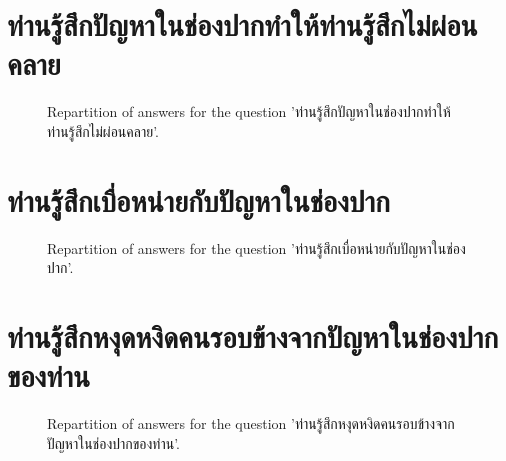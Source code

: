 \documentclass[12pt]{article}
\begin{document}
\clearpage{}
\section{ท่านรู้สึกปัญหาในช่องปากทำให้ท่านรู้สึกไม่ผ่อนคลาย}

\label{sec:138}


\begin{figure}[h!]
    \caption{\label{figure:q138-1}Repartition of answers for the question 'ท่านรู้สึกปัญหาในช่องปากทำให้ท่านรู้สึกไม่ผ่อนคลาย'.}
\end{figure}



\clearpage{}
\section{ท่านรู้สึกเบื่อหน่ายกับปัญหาในช่องปาก}

\label{sec:139}


\begin{figure}[h!]
    \caption{\label{figure:q139-1}Repartition of answers for the question 'ท่านรู้สึกเบื่อหน่ายกับปัญหาในช่องปาก'.}
\end{figure}



\clearpage{}
\section{ท่านรู้สึกหงุดหงิดคนรอบข้างจากปัญหาในช่องปากของท่าน}

\label{sec:140}


\begin{figure}[h!]
    \caption{\label{figure:q140-1}Repartition of answers for the question 'ท่านรู้สึกหงุดหงิดคนรอบข้างจากปัญหาในช่องปากของท่าน'.}
\end{figure}
\end{document}

